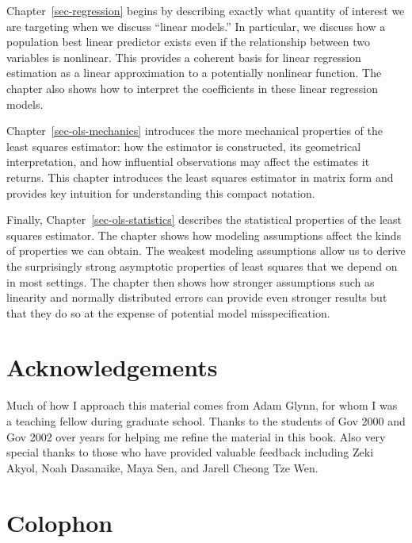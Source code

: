 \documentclass[
  13pt,
  letterpaper,
  DIV=11,
  numbers=noendperiod]{scrreprt}
\theoremstyle{plain}
\theoremstyle{plain}
\theoremstyle{definition}
\theoremstyle{definition}
\theoremstyle{remark}
\begin{document}
Chapter~\ref{sec-regression} begins by describing exactly what quantity
of interest we are targeting when we discuss ``linear models.'' In
particular, we discuss how a population best linear predictor exists
even if the relationship between two variables is nonlinear. This
provides a coherent basis for linear regression estimation as a linear
approximation to a potentially nonlinear function. The chapter also
shows how to interpret the coefficients in these linear regression
models.

Chapter~\ref{sec-ols-mechanics} introduces the more mechanical
properties of the least squares estimator: how the estimator is
constructed, its geometrical interpretation, and how influential
observations may affect the estimates it returns. This chapter
introduces the least squares estimator in matrix form and provides key
intuition for understanding this compact notation.

Finally, Chapter~\ref{sec-ols-statistics} describes the statistical
properties of the least squares estimator. The chapter shows how
modeling assumptions affect the kinds of properties we can obtain. The
weakest modeling assumptions allow us to derive the surprisingly strong
asymptotic properties of least squares that we depend on in most
settings. The chapter then shows how stronger assumptions such as
linearity and normally distributed errors can provide even stronger
results but that they do so at the expense of potential model
misspecification.

\section*{Acknowledgements}\label{acknowledgements}


Much of how I approach this material comes from Adam Glynn, for whom I
was a teaching fellow during graduate school. Thanks to the students of
Gov 2000 and Gov 2002 over years for helping me refine the material in
this book. Also very special thanks to those who have provided valuable
feedback including Zeki Akyol, Noah Dasanaike, Maya Sen, and Jarell
Cheong Tze Wen.

\section*{Colophon}\label{colophon}
\end{document}
